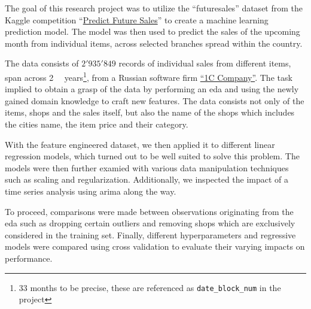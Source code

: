 The goal of this research project was to utilize the \enquote{\gls{futuresales}} dataset from the Kaggle competition \enquote{\href{https://www.kaggle.com/c/competitive-data-science-predict-future-sales}{Predict Future Sales}} to create a machine learning prediction model.
The model was then used to predict the sales of the upcoming month from individual items, across selected branches spread within the country.

The data consists of $2'935'849$ records of individual sales from different items, span across \mbox{2 \textonehalf} \ years\footnote{33 months to be precise, these are referenced as \texttt{date\_block\_num} in the project}, from a Russian software firm \href{https://1c.ru/eng/title.htm}{\enquote{1C Company}}.
The task implied to obtain a grasp of the data by performing an \acrfull{eda} and using the newly gained domain knowledge to craft new features.
The data consists not only of the items, shops and the sales itself, but also the name of the shops which includes the cities name, the item price and their category.

With the feature engineered dataset, we then applied it to different linear regression models, which turned out to be well suited to solve this problem.
The models were then further examied with various data manipulation techniques such as scaling and regularization.
Additionally, we inspected the impact of a time series analysis using \acrshort{arima} along the way.

To proceed, comparisons were made between observations originating from the \acrshort{eda} such as dropping certain outliers and removing shops which are exclusively considered in the training set.
Finally, different \glspl{hyperparameter} and regressive models were compared using cross validation to evaluate their varying impacts on performance.
